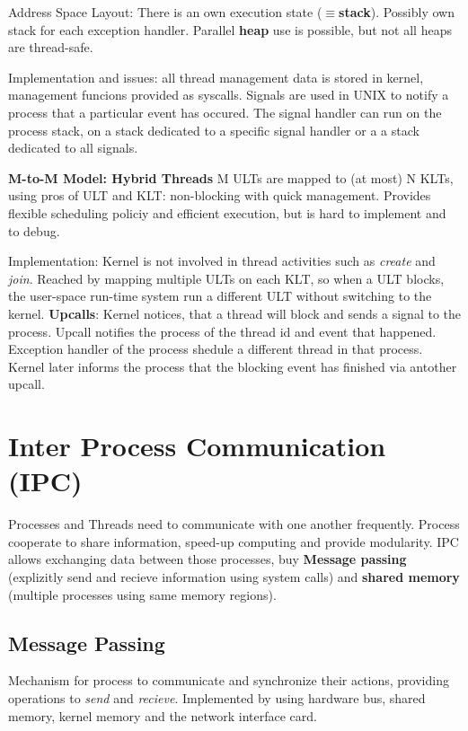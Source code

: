 \documentclass[11pt,a4paper]{article}
\begin{document}
	Address Space Layout: There is an own execution state ($\equiv$\textbf{stack}). Possibly own stack for each exception handler. Parallel \textbf{heap} use is possible, but not all heaps are thread-safe.
	
	Implementation and issues: all thread management data is stored in kernel, management funcions provided as syscalls. Signals are used in UNIX to notify a process that a particular event has occured. The signal handler can run on the process stack, on a stack dedicated to a specific signal handler or a a stack dedicated to all signals. \newline
	
	\textbf{M-to-M Model: Hybrid Threads} \newline
	M ULTs are mapped to (at most) N KLTs, using pros of ULT and KLT: non-blocking with quick management. Provides flexible scheduling policiy and efficient execution, but is hard to implement and to debug.
	
	Implementation: Kernel is not involved in thread activities such as \textit{create} and \textit{join}. Reached by mapping multiple ULTs on each KLT, so when a ULT blocks, the user-space run-time system run a different ULT without switching to the kernel. \textbf{Upcalls}: Kernel notices, that a thread will block and sends a signal to the process. Upcall notifies the process of the thread id and event that happened. Exception handler of the process shedule a different thread in that process. Kernel later informs the process that the blocking event has finished via antother upcall.
	
	\section{Inter Process Communication (IPC)}
	
	Processes and Threads need to communicate with one another frequently. Process cooperate to share information, speed-up computing and provide modularity. IPC allows exchanging data between those processes, buy \textbf{Message passing} (explizitly send and recieve information using system calls) and \textbf{shared memory} (multiple processes using same memory regions). \newline
	
	\subsection{Message Passing}
	Mechanism for process to communicate and synchronize their actions, providing operations to \textit{send} and \textit{recieve}. Implemented by using hardware bus, shared memory, kernel memory and the network interface card. \newline
	
\end{document}
